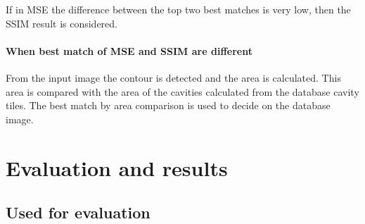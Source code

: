 \documentclass{article}
\begin{document}
If in MSE the difference between the top two best matches is very low, then the SSIM result is considered.

\paragraph*{When best match of MSE and SSIM are different}

From the input image the contour is detected and the area is calculated. This area is compared with the area of the cavities calculated from the database cavity tiles. The best match by area comparison is used to decide on the database image.

\section{Evaluation and results}

\subsection{Used for evaluation}
\end{document}
